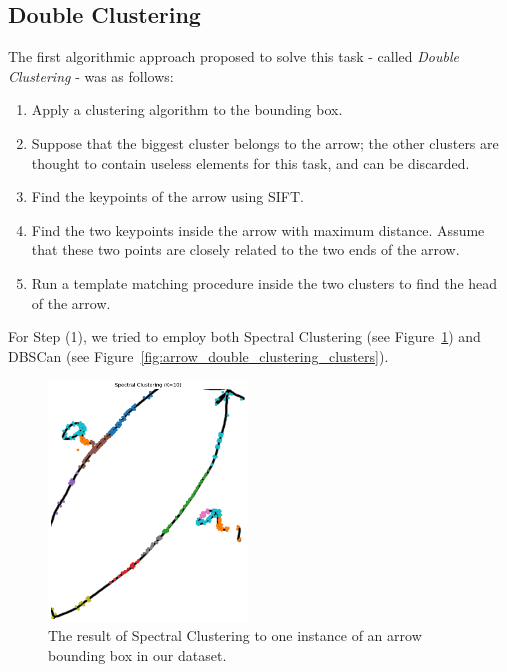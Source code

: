 \documentclass[conference]{IEEEtran}
\begin{document}
\begin{appendices}

\section{Double Clustering}
\label{double_clustering}
The first algorithmic approach proposed to solve this task - called \textit{Double Clustering} - was as follows: 
\begin{enumerate}
	\item Apply a clustering algorithm to the bounding box.
	\item Suppose that the biggest cluster belongs to the arrow; the other clusters are thought to contain useless elements for this task, and can be discarded.
	\item Find the keypoints of the arrow using SIFT.
	\item Find the two keypoints inside the arrow with maximum distance. Assume that these two points are closely related to the two ends of the arrow.
	\item Run a template matching procedure inside the two clusters to find the head of the arrow.
\end{enumerate}

For Step (1), we tried to employ both Spectral Clustering (see Figure~\ref{fig:spectral_clustering}) and DBSCan (see Figure~\ref{fig:arrow_double_clustering_clusters}).

\begin{figure}[H]
	\centering
	\includegraphics[width=150pt]{spectral_clustering.png}
	\caption{The result of Spectral Clustering to one instance of an arrow bounding box in our dataset.}
	\label{fig:spectral_clustering}
\end{figure}


\end{appendices}
\end{document}

